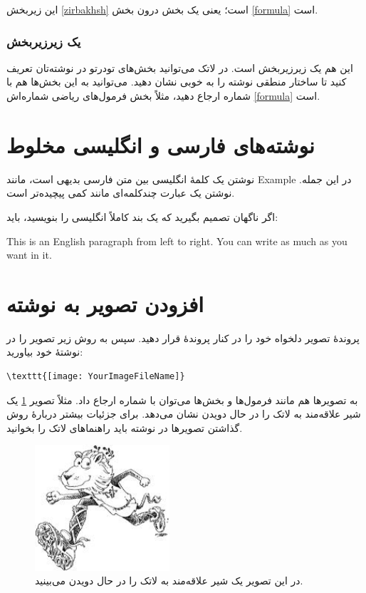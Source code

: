 این زیربخش \ref{zirbakhsh} است؛ یعنی یک بخش درون بخش \ref{formula} است.
\subsubsection{یک زیرزیربخش}
این هم یک زیرزیربخش است. در لاتک می‌توانید بخش‌های تودرتو در نوشته‌تان تعریف کنید تا ساختار منطقی نوشته را به خوبی نشان دهید. می‌توانید به این بخش‌ها هم با شماره ارجاع دهید، مثلاً بخش فرمول‌های ریاضی شماره‌اش \ref{formula} است.
\section{نوشته‌های فارسی و انگلیسی مخلوط}
نوشتن یک کلمهٔ انگلیسی بین متن فارسی بدیهی است، مانند Example در این جمله.
نوشتن یک عبارت چندکلمه‌ای مانند
  کمی پیچیده‌تر است.

اگر ناگهان تصمیم بگیرید که یک بند کاملاً انگلیسی را بنویسید، باید:
\begin{latin}
This is an English paragraph from left to right. You can write as much as you want in it.
\end{latin}
\section{افزودن تصویر به نوشته}
پروندهٔ تصویر دلخواه خود را در کنار پروندهٔ  قرار دهید. سپس به روش زیر تصویر را در نوشتهٔ خود بیاورید:
\begin{latin}
\begin{verbatim}
\texttt{[image: YourImageFileName]}
\end{verbatim}
\end{latin}
به تصویرها هم مانند فرمول‌ها و بخش‌ها می‌توان با شماره ارجاع داد. مثلاً تصویر  \ref{fig:shir} یک شیر علاقه‌مند به لاتک را در حال دویدن نشان می‌دهد. برای جزئیات بیشتر دربارهٔ روش گذاشتن تصویرها در نوشته باید راهنماهای لاتک را بخوانید.
\begin{figure}%
\centerline{\includegraphics[width=5cm]{graphics/lion}}
\caption{در این تصویر یک شیر علاقه‌مند به لاتک را در حال دویدن می‌بینید.}
\label{fig:shir}
\end{figure}

